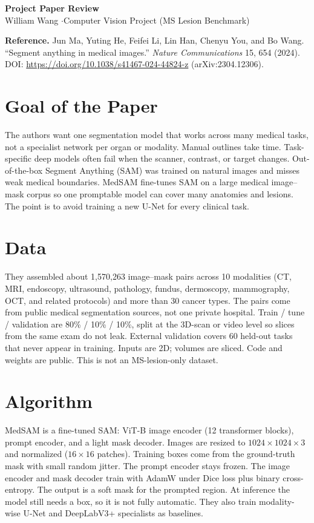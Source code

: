 \documentclass[10pt]{article}
\begin{document}
\begin{center}
{\large\textbf{Project Paper Review}}\\[0.15em]
William Wang \quad$\cdot$\quad Computer Vision Project (MS Lesion Benchmark)
\end{center}

\noindent\textbf{Reference.}
Jun Ma, Yuting He, Feifei Li, Lin Han, Chenyu You, and Bo Wang.
``Segment anything in medical images.''
\textit{Nature Communications} 15, 654 (2024).
DOI: \url{https://doi.org/10.1038/s41467-024-44824-z}
(arXiv:2304.12306).

\section*{Goal of the Paper}
The authors want one segmentation model that works across many medical tasks, not a specialist network per organ or modality. Manual outlines take time. Task-specific deep models often fail when the scanner, contrast, or target changes. Out-of-the-box Segment Anything (SAM) was trained on natural images and misses weak medical boundaries. MedSAM fine-tunes SAM on a large medical image--mask corpus so one promptable model can cover many anatomies and lesions. The point is to avoid training a new U-Net for every clinical task.

\section*{Data}
They assembled about 1{,}570{,}263 image--mask pairs across 10 modalities (CT, MRI, endoscopy, ultrasound, pathology, fundus, dermoscopy, mammography, OCT, and related protocols) and more than 30 cancer types. The pairs come from public medical segmentation sources, not one private hospital. Train / tune / validation are 80\% / 10\% / 10\%, split at the 3D-scan or video level so slices from the same exam do not leak. External validation covers 60 held-out tasks that never appear in training. Inputs are 2D; volumes are sliced. Code and weights are public. This is not an MS-lesion-only dataset.

\section*{Algorithm}
MedSAM is a fine-tuned SAM: ViT-B image encoder (12 transformer blocks), prompt encoder, and a light mask decoder. Images are resized to $1024\times1024\times 3$ and normalized ($16\times16$ patches). Training boxes come from the ground-truth mask with small random jitter. The prompt encoder stays frozen. The image encoder and mask decoder train with AdamW under Dice loss plus binary cross-entropy. The output is a soft mask for the prompted region. At inference the model still needs a box, so it is not fully automatic. They also train modality-wise U-Net and DeepLabV3+ specialists as baselines.
\end{document}
